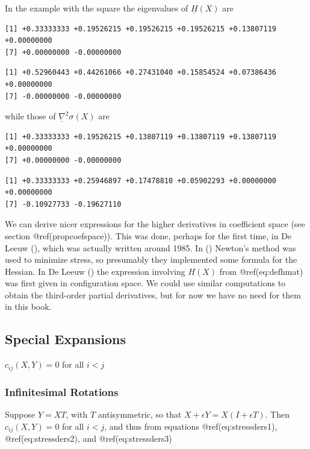 \documentclass[
  12pt,
  letterpaper,
  DIV=11,
  numbers=noendperiod]{scrreprt}
\theoremstyle{remark}
\begin{document}
In the example with the square the eigenvalues of \(\underline{H}(X)\)
are

\begin{verbatim}
[1] +0.33333333 +0.19526215 +0.19526215 +0.19526215 +0.13807119 +0.00000000
[7] +0.00000000 -0.00000000
\end{verbatim}

\begin{verbatim}
[1] +0.52960443 +0.44261066 +0.27431040 +0.15854524 +0.07386436 +0.00000000
[7] -0.00000000 -0.00000000
\end{verbatim}

while those of \(\underline{\nabla}^2\sigma(X)\) are

\begin{verbatim}
[1] +0.33333333 +0.19526215 +0.13807119 +0.13807119 +0.13807119 +0.00000000
[7] +0.00000000 -0.00000000
\end{verbatim}

\begin{verbatim}
[1] +0.33333333 +0.25946897 +0.17478810 +0.05902293 +0.00000000 +0.00000000
[7] -0.10927733 -0.19627110
\end{verbatim}

We can derive nicer expressions for the higher derivatives in
coefficient space (see section @ref(propcoefspace)). This was done,
perhaps for the first time, in De Leeuw
(), which was actually written around
1985. In
()
Newton's method was used to minimize stress, so presumably they
implemented some formula for the Hessian. In De Leeuw
() the expression involving \(H(X)\)
from @ref(eq:defhmat) was first given in configuration space. We could
use similar computations to obtain the third-order partial derivatives,
but for now we have no need for them in this book.

\subsection{Special Expansions}\label{propspecexp}

\(c_{ij}(X,Y)=0\) for all \(i<j\)

\subsubsection{Infinitesimal Rotations}\label{infinitesimal-rotations}

Suppose \(Y=XT\), with \(T\) antisymmetric, so that
\(X+\epsilon Y=X(I+\epsilon T)\). Then \(c_{ij}(X,Y)=0\) for all
\(i<j\), and thus from equations @ref(eq:stressders1),
@ref(eq:stressders2), and @ref(eq:stressders3)
\end{document}
